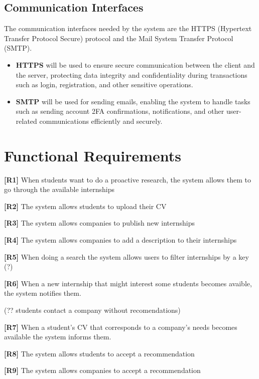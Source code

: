 \subsection{Communication Interfaces}
The communication interfaces needed by the system are the HTTPS (Hypertext Transfer Protocol Secure) protocol and the Mail System Transfer Protocol (SMTP). 

\begin{itemize}
    \item \textbf{HTTPS} will be used to ensure secure communication between the client and the server, protecting data integrity and confidentiality during transactions such as login, registration, and other sensitive operations.
    
    \item \textbf{SMTP} will be used for sending emails, enabling the system to handle tasks such as sending account 2FA confirmations, notifications, and other user-related communications efficiently and securely.

\end{itemize}

\section{Functional Requirements}

\textbf{[R1]} When students want to do a proactive research, the system allows them to go through the available internships

\textbf{[R2]} The system allows students to upload their CV

\textbf{[R3]} The system allows companies to publish new internships

\textbf{[R4]} The system allows companies to add a description to their internships

\textbf{[R5]} When doing a search the system allows users to filter internships by a key (?)

\textbf{[R6]} When a new internship that might interest some students becomes avaible, the system notifies them.

(?? students contact a company without recomendations)

\textbf{[R7]} When a student's CV that corresponds to a company's needs becomes available the system informs them. 

\textbf{[R8]} The system allows students to accept a recommendation

\textbf{[R9]} The system allows companies to accept a recommendation 

